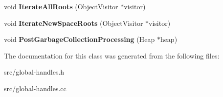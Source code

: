 \begin{DoxyCompactItemize}
\item 
\hypertarget{classv8_1_1internal_1_1_eternal_handles_a9f411f6a9b612dacf6e40bba71a91796}{}void {\bfseries Iterate\+All\+Roots} (Object\+Visitor $\ast$visitor)\label{classv8_1_1internal_1_1_eternal_handles_a9f411f6a9b612dacf6e40bba71a91796}

\item 
\hypertarget{classv8_1_1internal_1_1_eternal_handles_aea775603d28824996a43ca0e2781f7aa}{}void {\bfseries Iterate\+New\+Space\+Roots} (Object\+Visitor $\ast$visitor)\label{classv8_1_1internal_1_1_eternal_handles_aea775603d28824996a43ca0e2781f7aa}

\item 
\hypertarget{classv8_1_1internal_1_1_eternal_handles_a895a3eeda0f0942c67b78e3cf049010d}{}void {\bfseries Post\+Garbage\+Collection\+Processing} (Heap $\ast$heap)\label{classv8_1_1internal_1_1_eternal_handles_a895a3eeda0f0942c67b78e3cf049010d}

\end{DoxyCompactItemize}


The documentation for this class was generated from the following files\+:\begin{DoxyCompactItemize}
\item 
src/global-\/handles.\+h\item 
src/global-\/handles.\+cc\end{DoxyCompactItemize}
